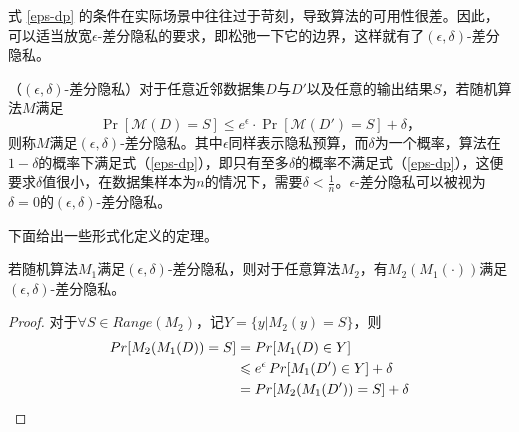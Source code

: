 式 \ref{eps-dp} 的条件在实际场景中往往过于苛刻，导致算法的可用性很差。因此，可以适当放宽$\epsilon$-差分隐私的要求，即松弛一下它的边界，这样就有了$(\epsilon, \delta)$-差分隐私。

\begin{definition}
	（$(\epsilon, \delta)$-差分隐私\cite{Algorithmic_Foundations_of_DP}）对于任意近邻数据集$D$与$D'$以及任意的输出结果$S$，若随机算法$M$满足
	\begin{equation}
		\label{eps-delta-dp}
		\mathop{Pr}[\mathcal{M}(D) = S] \leq e^{\epsilon} \cdot \mathop{Pr}[\mathcal{M}(D') = S] + \delta\text{，}
	\end{equation}
	则称$M$满足$(\epsilon, \delta)$-差分隐私。其中$\epsilon$同样表示隐私预算，而$\delta$为一个概率，算法在$1-\delta$的概率下满足式（\ref{eps-dp}），即只有至多$\delta$的概率不满足式（\ref{eps-dp}），这便要求$\delta$值很小，在数据集样本为$n$的情况下\cite{Mechanism_DP}，需要$\delta<\frac{1}{n}$。$\epsilon$-差分隐私可以被视为$\delta=0$的$(\epsilon, \delta)$-差分隐私。
\end{definition}


下面给出一些形式化定义的定理。

\begin{theorem}\cite{Algorithmic_Foundations_of_DP}
	若随机算法$M_1$满足$(\epsilon, \delta)$-差分隐私，则对于任意算法$M_2$，有$M_2(M_1(\cdot))$满足$(\epsilon, \delta)$-差分隐私。
\end{theorem}

\begin{proof}
	对于$\forall S\in Range(M_2)$，记$Y=\{y|M_2(y)=S\}$，则
	\begin{align}
	\mathop{Pr}[M_2(M_1(D))=S]&=\mathop{Pr}[M_1(D)\in Y]\notag\\
	&\leq e^\epsilon \mathop{Pr}[M_1(D')\in Y]+\delta\notag\\
	&=\mathop{Pr}[M_2(M_1(D'))=S]+\delta\notag
	\end{align}
\end{proof}

